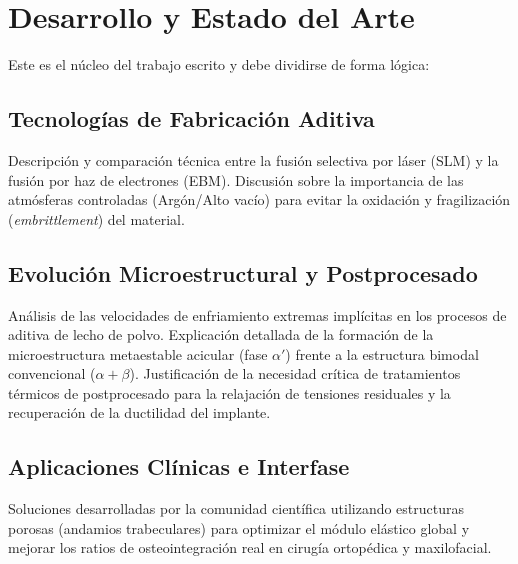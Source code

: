 \section{Desarrollo y Estado del Arte}
\label{sec:desarrollo}
Este es el núcleo del trabajo escrito y debe dividirse de forma lógica:

\subsection{Tecnologías de Fabricación Aditiva}
Descripción y comparación técnica entre la fusión selectiva por láser (SLM) y la fusión por haz de electrones (EBM). Discusión sobre la importancia de las atmósferas controladas (Argón/Alto vacío) para evitar la oxidación y fragilización (\textit{embrittlement}) del material.

\subsection{Evolución Microestructural y Postprocesado}
Análisis de las velocidades de enfriamiento extremas implícitas en los procesos de aditiva de lecho de polvo. Explicación detallada de la formación de la microestructura metaestable acicular (fase $\alpha'$) frente a la estructura bimodal convencional ($\alpha+\beta$). Justificación de la necesidad crítica de tratamientos térmicos de postprocesado para la relajación de tensiones residuales y la recuperación de la ductilidad del implante.

\subsection{Aplicaciones Clínicas e Interfase}
Soluciones desarrolladas por la comunidad científica utilizando estructuras porosas (andamios trabeculares) para optimizar el módulo elástico global y mejorar los ratios de osteointegración real en cirugía ortopédica y maxilofacial.
